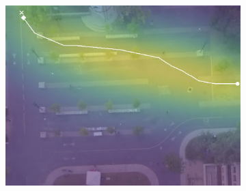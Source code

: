 \documentclass[letterpaper,10pt,conference]{ieeetran}
\begin{document}
\begin{figure}[t!]
\begin{subfigure}[t]{0.48\textwidth}
	\begin{minipage}[c]{0.3\linewidth}
		\includegraphics[width=\linewidth]{./figures/bookstore/ours_1_2_t=370.jpg}
	\end{minipage}
	

\end{subfigure}
\end{figure}
\end{document}
